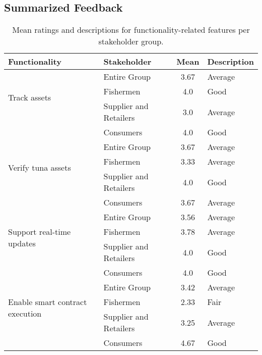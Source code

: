 \subsection{Summarized Feedback}
	\begin{table}[h]
		\centering
		\begin{tabular}{|l|l|c|l|}
			\hline
			\textbf{Functionality} & \textbf{Stakeholder} & \textbf{Mean} & \textbf{Description} \\ \hline
			\multirow{3}{*}{Track assets} 
			& Entire Group & 3.67 & Average \\ \cline{2-4}
			& Fishermen & 4.0 & Good \\ \cline{2-4}
			& Supplier and Retailers & 3.0 & Average \\ \cline{2-4}
			& Consumers & 4.0 & Good \\ \hline
			
			\multirow{3}{*}{Verify tuna assets} 
			& Entire Group & 3.67 & Average \\ \cline{2-4}
			& Fishermen & 3.33 & Average \\ \cline{2-4}
			& Supplier and Retailers & 4.0 & Good \\ \cline{2-4}
			& Consumers & 3.67 & Average \\ \hline
			
			\multirow{3}{*}{Support real-time updates} 
			& Entire Group & 3.56 & Average \\ \cline{2-4}
			& Fishermen & 3.78 & Average \\ \cline{2-4}
			& Supplier and Retailers & 4.0 & Good \\ \cline{2-4}
			& Consumers & 4.0 & Good \\ \hline
			
			\multirow{3}{*}{Enable smart contract execution} 
			& Entire Group & 3.42 & Average \\ \cline{2-4}
			& Fishermen & 2.33 & Fair \\ \cline{2-4}
			& Supplier and Retailers & 3.25 & Average \\ \cline{2-4}
			& Consumers & 4.67 & Good \\ \hline
			
		\end{tabular}
		\caption{Mean ratings and descriptions for functionality-related features per stakeholder group.}
		\label{tab:functionality}
	\end{table}
	
